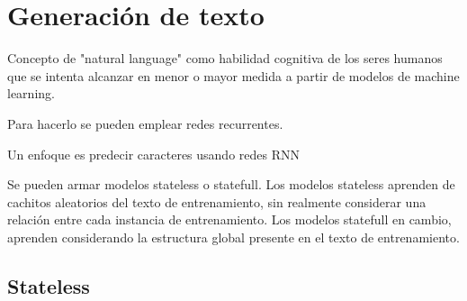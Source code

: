 \section{Generación de texto}

Concepto de "natural language" como habilidad cognitiva de los seres humanos que se intenta alcanzar en menor o mayor medida a partir de modelos de machine learning.

Para hacerlo se pueden emplear redes recurrentes. 

Un enfoque es predecir caracteres usando redes RNN

Se pueden armar modelos stateless o statefull. Los modelos stateless aprenden de cachitos aleatorios del texto de entrenamiento, sin realmente considerar una relación entre cada instancia de entrenamiento. Los modelos statefull en cambio, aprenden considerando la estructura global presente en el texto de entrenamiento. 

\subsection{Stateless}